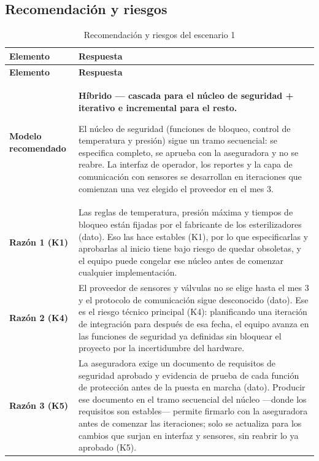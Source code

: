 \documentclass[12pt,a4paper]{article}
\begin{document}
\subsection{Recomendación y riesgos}

\begingroup\small\setlength{\tabcolsep}{4pt}
\begin{longtable}{>{\raggedright\arraybackslash}p{3.3cm} >{\raggedright\arraybackslash}p{12.2cm}}
\caption{Recomendación y riesgos del escenario 1}\\
\toprule
\textbf{Elemento} & \textbf{Respuesta} \\
\midrule
\endfirsthead
\toprule
\textbf{Elemento} & \textbf{Respuesta} \\
\midrule
\endhead
\textbf{Modelo recomendado} & \textbf{Híbrido — cascada para el núcleo de seguridad + iterativo e incremental para el resto.}\par\medskip El núcleo de seguridad (funciones de bloqueo, control de temperatura y presión) sigue un tramo secuencial: se especifica completo, se aprueba con la aseguradora y no se reabre. La interfaz de operador, los reportes y la capa de comunicación con sensores se desarrollan en iteraciones que comienzan una vez elegido el proveedor en el mes 3. \\ \midrule
\textbf{Razón 1 (K1)} & Las reglas de temperatura, presión máxima y tiempos de bloqueo están fijadas por el fabricante de los esterilizadores (dato). Eso las hace estables (K1), por lo que especificarlas y aprobarlas al inicio tiene bajo riesgo de quedar obsoletas, y el equipo puede congelar ese núcleo antes de comenzar cualquier implementación. \\ \midrule
\textbf{Razón 2 (K4)} & El proveedor de sensores y válvulas no se elige hasta el mes 3 y el protocolo de comunicación sigue desconocido (dato). Ese es el riesgo técnico principal (K4): planificando una iteración de integración para después de esa fecha, el equipo avanza en las funciones de seguridad ya definidas sin bloquear el proyecto por la incertidumbre del hardware. \\ \midrule
\textbf{Razón 3 (K5)} & La aseguradora exige un documento de requisitos de seguridad aprobado y evidencia de prueba de cada función de protección antes de la puesta en marcha (dato). Producir ese documento en el tramo secuencial del núcleo ---donde los requisitos son estables--- permite firmarlo con la aseguradora antes de comenzar las iteraciones; solo se actualiza para los cambios que surjan en interfaz y sensores, sin reabrir lo ya aprobado (K5). \\ \midrule

\end{longtable}
\end{document}
